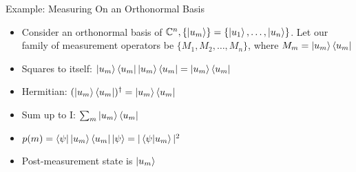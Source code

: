 \documentclass[handout, 10 pt]{beamer}
\begin{document}

\begin{frame}{Example: Measuring On an Orthonormal Basis}
\begin{itemize}
    \item Consider an orthonormal basis of $\mathbb{C}^n, \{\ket{u_m}\}=\{\ket{u_1},\hdots, \ket{u_n}\}$. Let our family of measurement operators be $\{M_1, M_2, \hdots, M_n\}$, where $M_m=\ket{u_m}\bra{u_m}$
    \pause
    \item Squares to itself: 
    $\ket{u_m}\bra{u_m} \ket{u_m}\bra{u_m}=\ket{u_m}\bra{u_m}$
    \pause
    \item  Hermitian: $(\ket{u_m}\bra{u_m})^\dagger=\ket{u_m}\bra{u_m}$
    \pause
    \item Sum up to I: $\sum_m \ket{u_m}\bra{u_m}$
    \pause
    \item $p(m)=\bra{\psi}\ket{u_m}\bra{u_m}\ket{\psi}=|\braket{\psi|u_m}|^2$
    \pause
    \item Post-measurement state is $\ket{u_m}$
\end{itemize}
\end{frame}
\end{document}
